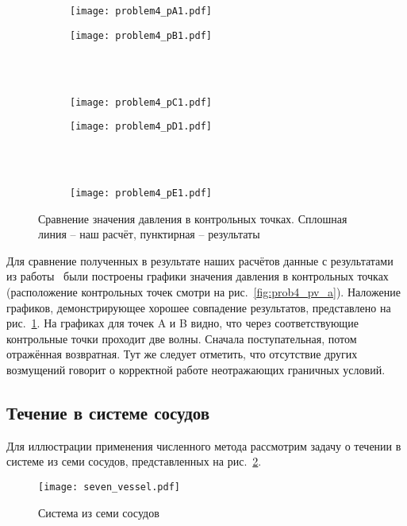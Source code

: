 \begin{figure}[h!]
\begin{subfigure}{0.5\linewidth}\centering
\texttt{[image: problem4\_pA1.pdf]}
\end{subfigure}%
\begin{subfigure}{0.5\linewidth}\centering
\texttt{[image: problem4\_pB1.pdf]}
\end{subfigure} \\
\hfill \\
\begin{subfigure}{0.5\linewidth}\centering
\texttt{[image: problem4\_pC1.pdf]}
\end{subfigure}%
\begin{subfigure}{0.5\linewidth}\centering
\texttt{[image: problem4\_pD1.pdf]}
\end{subfigure}\\
\hfill \\
\begin{subfigure}{0.5\linewidth}\centering
\texttt{[image: problem4\_pE1.pdf]}
\end{subfigure}%
\caption{Сравнение значения давления в контрольных точках. Сплошная линия -- наш расчёт, пунктирная -- результаты~\cite{Xiu:2007}}\label{fig:prob4_pt}
\end{figure}

Для сравнение полученных в результате наших расчётов данные с результатами из работы~\cite{Xiu:2007} 
были построены графики значения давления в контрольных точках (расположение контрольных точек смотри на рис.~\ref{fig:prob4_pv_a}).
Наложение графиков, демонстрирующее хорошее совпадение результатов, представлено на рис.~\ref{fig:prob4_pt}.
На графиках для точек A и B видно, что через соответствующие контрольные точки проходит
две волны. Сначала поступательная, потом отражённая возвратная.
Тут же следует отметить, что отсутствие других возмущений
говорит о корректной работе неотражающих граничных условий.


\subsection{Течение в системе сосудов}
Для иллюстрации применения численного метода
рассмотрим задачу о течении в системе из семи сосудов, представленных на рис.~\ref{fig:seven_vessel}.
\begin{figure}[h!]
\centering
\texttt{[image: seven\_vessel.pdf]}
\caption{Система из семи сосудов}\label{fig:seven_vessel}
\end{figure}%

